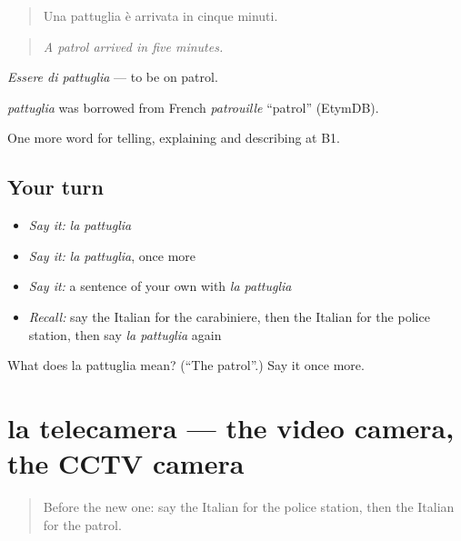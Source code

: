 \begin{quote}
Una pattuglia è arrivata in cinque minuti.
\end{quote}

\begin{quote}
\emph{A patrol arrived in five minutes.}
\end{quote}

\emph{Essere di pattuglia} — to be on patrol.

\begin{cousinweb}
\emph{pattuglia} was borrowed from French \emph{patrouille} \textquotedblleft{}patrol\textquotedblright{} (EtymDB).
\end{cousinweb}

\begin{grammarlens}[title={What you've built}]
One more word for telling, explaining and describing at B1.
\end{grammarlens}

\subsection*{Your turn}
\begin{itemize}
\raggedright
  \item \emph{Say it:} \emph{la pattuglia}
  \item \emph{Say it:} \emph{la pattuglia}, once more
  \item \emph{Say it:} a sentence of your own with \emph{la pattuglia}
  \item \emph{Recall:} say the Italian for the carabiniere, then the Italian for the police station, then say \emph{la pattuglia} again
\end{itemize}

\begin{tcolorbox}[breakable,colback=teal!4,colframe=teal!35!black,title={Before you move on}]
What does la pattuglia mean? (\textquotedblleft{}The patrol\textquotedblright{}.) Say it once more.
\end{tcolorbox}
\section[la telecamera]{la telecamera — the video camera, the CCTV camera}

\label{lesson:IT-C294-telecamera}



\begin{quote}
Before the new one: say the Italian for the police station, then the Italian for the patrol.
\end{quote}

